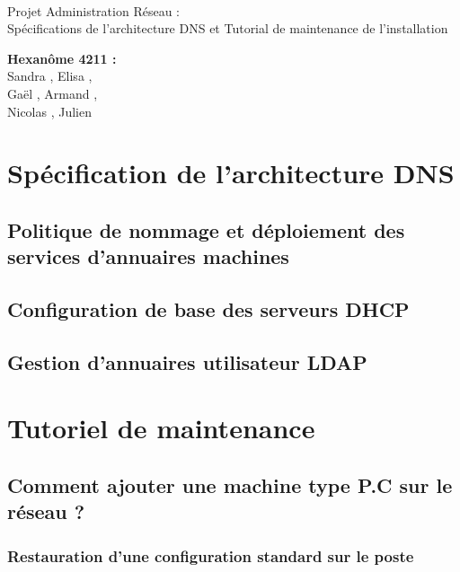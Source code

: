 \documentclass[a4paper]{article}
\begin{document}
\begin{titlepage}
	~ 
	\vfill
	\begin{center}
		\begin{Huge}
			Projet Administration Réseau : \\ Spécifications de l'architecture DNS et Tutorial de maintenance de l'installation\\
		\end{Huge}
	\vfill
		\textbf{Hexanôme 4211 :} 
			\\Sandra {}, Elisa , 
			\\Gaël , Armand , 
			\\Nicolas {}, Julien \\
	\vfill
	\end{center}
	\vfill
\end{titlepage}

\newpage
\tableofcontents
\newpage

\section{Spécification de l'architecture DNS}

\subsection{Politique de nommage et déploiement des services d'annuaires machines }

\subsection{Configuration de base des serveurs DHCP}

\subsection{Gestion d'annuaires utilisateur LDAP}

\section{Tutoriel de maintenance}

\subsection{Comment ajouter une machine type P.C sur le réseau ?}

\subsubsection{Restauration d'une configuration standard sur le poste}
\end{document}

